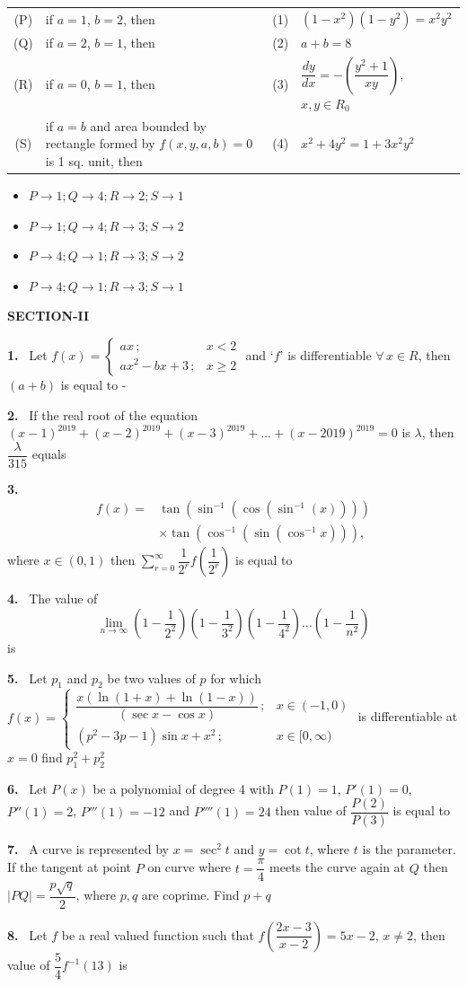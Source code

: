 \documentclass[10pt]{extarticle}
\newcommand{\sect}[1]{\par\smallskip\noindent\textbf{#1}\par}
\newcommand{\qn}[1]{\par\smallskip\noindent\textbf{#1.}~}
\newenvironment{qoptions}{\begin{itemize}[leftmargin=1.8em,itemsep=1pt,topsep=2pt,label={}]}{\end{itemize}}
\newcommand{\opt}[2]{\item[(#1)] #2}
\begin{document}
\begin{multicols}{2}
\begin{center}
\begin{tabular}{|c|l|c|l|}
\hline
(P) & if $a=1$, $b=2$, then & (1) & $(1-x^2)(1-y^2)=x^2y^2$\\[4pt]
(Q) & if $a=2$, $b=1$, then & (2) & $a+b=8$\\[4pt]
(R) & if $a=0$, $b=1$, then & (3) & \parbox[t]{2.6cm}{$\dfrac{dy}{dx}=-\left(\dfrac{y^2+1}{xy}\right)$, $x,y\in R_0$}\\[10pt]
(S) & \parbox[t]{3.1cm}{if $a=b$ and area bounded by rectangle formed by $f(x,y,a,b)=0$ is 1 sq. unit, then} & (4) & $x^2+4y^2=1+3x^2y^2$\\[3pt]
\hline
\end{tabular}
\end{center}
\begin{qoptions}
\opt{A}{$P\to1;Q\to4;R\to2;S\to1$}
\opt{B}{$P\to1;Q\to4;R\to3;S\to2$}
\opt{C}{$P\to4;Q\to1;R\to3;S\to2$}
\opt{D}{$P\to4;Q\to1;R\to3;S\to1$}
\end{qoptions}
\sect{SECTION-II}
\qn{1} Let $f(x)=\begin{cases}ax\,; & x<2\\ ax^2-bx+3\,; & x\geqslant2\end{cases}$ and `$f$' is differentiable $\forall\,x\in R$, then $(a+b)$ is equal to -
\qn{2} If the real root of the equation $(x-1)^{2019}+(x-2)^{2019}+(x-3)^{2019}+\ldots+(x-2019)^{2019}=0$ is $\lambda$, then $\dfrac{\lambda}{315}$ equals
\qn{3} \[\begin{aligned}f(x)={}&\tan(\sin^{-1}(\cos(\sin^{-1}(x))))\\&\times\tan(\cos^{-1}(\sin(\cos^{-1}x))),\end{aligned}\]where $x\in(0,1)$ then $\displaystyle\sum_{r=0}^{\infty}\dfrac{1}{2^r}f\left(\dfrac{1}{2^r}\right)$ is equal to
\qn{4} The value of\[\lim_{n\to\infty}\left(1-\dfrac1{2^2}\right)\left(1-\dfrac1{3^2}\right)\left(1-\dfrac1{4^2}\right)\ldots\left(1-\dfrac1{n^2}\right)\]is
\qn{5} Let $p_1$ and $p_2$ be two values of $p$ for which $f(x)=\begin{cases}\dfrac{x(\ln(1+x)+\ln(1-x))}{(\sec x-\cos x)}\,; & x\in(-1,0)\\[6pt] \left(p^2-3p-1\right)\sin x+x^2\,; & x\in[0,\infty)\end{cases}$ is differentiable at $x=0$ find $p_1^2+p_2^2$
\qn{6} Let $P(x)$ be a polynomial of degree 4 with $P(1)=1$, $P'(1)=0$, $P''(1)=2$, $P'''(1)=-12$ and $P''''(1)=24$ then value of $\dfrac{P(2)}{P(3)}$ is equal to
\qn{7} A curve is represented by $x=\sec^2t$ and $y=\cot t$, where $t$ is the parameter. If the tangent at point $P$ on curve where $t=\dfrac\pi4$ meets the curve again at $Q$ then $|PQ|=\dfrac{p\sqrt q}{2}$, where $p,q$ are coprime. Find $p+q$
\qn{8} Let $f$ be a real valued function such that $f\left(\dfrac{2x-3}{x-2}\right)=5x-2$, $x\neq2$, then value of $\dfrac54f^{-1}(13)$ is
\end{multicols}
\end{document}
